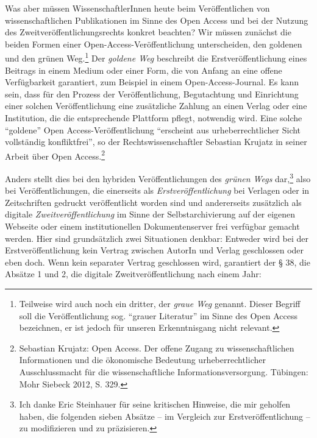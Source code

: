 \documentclass[a4paper,
fontsize=11pt,
oneside,
numbers=noperiodatend,
parskip=half-,
bibliography=totoc,
final
]{scrartcl}
\begin{document}
Was aber müssen WissenschaftlerInnen heute beim Veröffentlichen von
wissenschaftlichen Publikationen im Sinne des Open Access und bei der
Nutzung des Zweitveröffentlichungsrechts konkret beachten? Wir müssen
zunächst die beiden Formen einer Open-Access-Veröffentlichung
unterscheiden, den goldenen und den grünen Weg.\footnote{Teilweise wird
  auch noch ein dritter, der \emph{graue Weg} genannt. Dieser Begriff
  soll die Veröffentlichung sog. \enquote{grauer Literatur} im Sinne des
  Open Access bezeichnen, er ist jedoch für unseren Erkenntnisgang nicht
  relevant.} Der \emph{goldene Weg} beschreibt die Erstveröffentlichung
eines Beitrags in einem Medium oder einer Form, die von Anfang an eine
offene Verfügbarkeit garantiert, zum Beispiel in einem
Open-Access-Journal. Es kann sein, dass für den Prozess der
Veröffentlichung, Begutachtung und Einrichtung einer solchen
Veröffentlichung eine zusätzliche Zahlung an einen Verlag oder eine
Institution, die die entsprechende Plattform pflegt, notwendig wird.
Eine solche \enquote{goldene} Open Access-Veröffentlichung
\enquote{erscheint aus urheberrechtlicher Sicht vollständig
konfliktfrei}, so der Rechtswissenschaftler Sebastian Krujatz in seiner
Arbeit über Open Access.\footnote{Sebastian Krujatz: Open Access. Der
  offene Zugang zu wissenschaftlichen Informationen und die ökonomische
  Bedeutung urheberrechtlicher Ausschlussmacht für die wissenschaftliche
  Informationsversorgung. Tübingen: Mohr Siebeck 2012, S. 329.}

Anders stellt dies bei den hybriden Veröffentlichungen des \emph{grünen
Wegs} dar,\footnote{Ich danke Eric Steinhauer für seine kritischen
  Hinweise, die mir geholfen haben, die folgenden sieben Absätze -- im
  Vergleich zur Erstveröffentlichung -- zu modifizieren und zu
  präzisieren.} also bei Veröffentlichungen, die einerseits als
\emph{Erstveröffentlichung} bei Verlagen oder in Zeitschriften gedruckt
veröffentlicht worden sind und andererseits zusätzlich als digitale
\emph{Zweitveröffentlichung} im Sinne der Selbstarchivierung auf der
eigenen Webseite oder einem institutionellen Dokumentenserver frei
verfügbar gemacht werden. Hier sind grundsätzlich zwei Situationen
denkbar: Entweder wird bei der Erstveröffentlichung kein Vertrag
zwischen AutorIn und Verlag geschlossen oder eben doch. Wenn kein
separater Vertrag geschlossen wird, garantiert der § 38, die Absätze 1
und 2, die digitale Zweitveröffentlichung nach einem Jahr:
\end{document}

